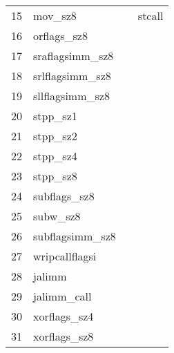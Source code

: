 \begin{table}[]
\begin{tabular}{|l|l|l|l|}
    15                       & mov\_sz8                  &                           & stcall                    \\
    16                       & orflags\_sz8              &                           &                           \\
    17                       & sraflagsimm\_sz8          &                           &                           \\
    18                       & srlflagsimm\_sz8          &                           &                           \\
    19                       & sllflagsimm\_sz8          &                           &                           \\
    20                       & stpp\_sz1                 &                           &                           \\
    21                       & stpp\_sz2                 &                           &                           \\
    22                       & stpp\_sz4                 &                           &                           \\
    23                       & stpp\_sz8                 &                           &                           \\
    24                       & subflags\_sz8             &                           &                           \\
    25                       & subw\_sz8                 &                           &                           \\
    26                       & subflagsimm\_sz8          &                           &                           \\
    27                       & wripcallflagsi            &                           &                           \\
    28                       & jalimm                    &                           &                           \\
    29                       & jalimm\_call              &                           &                           \\
    30                       & xorflags\_sz4             &                           &                           \\
    31                       & xorflags\_sz8             &                           &                          \\ \hline
    \end{tabular}
    \end{table}